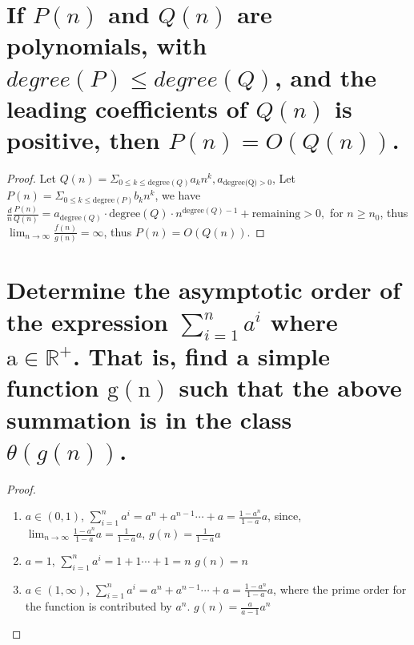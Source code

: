 \documentclass[a4paper]{article}
\begin{document}
\section{If $P(n)$ and $Q(n)$ are polynomials, with $degree(P) \leq degree (Q)$, and the leading coefficients of $Q(n)$ is positive, then $P(n) = O(Q(n))$.}
\begin{proof}
  Let $Q(n)= \Sigma_{0 \leq k\leq \text{degree}(Q)} a_k n^k, a_{\text{degree(Q)}>0}$, Let $P(n)= \Sigma_{0 \leq k\leq \text{degree}(P)} b_k n^k$, we have $\frac{d}{n} \frac{P(n)} {Q(n)}=a_{\text{degree}(Q)}\cdot{\text{degree}(Q)}\cdot n^{\text{degree}(Q)-1}+\text{remaining}>0,$ for $n\geq n_0$, thus $\lim _{n \rightarrow \infty} \frac{f(n)}{g(n)}=\infty$, thus $P(n)=O(Q(n))$.
\end{proof}
\section{Determine the asymptotic order of the expression $\sum_{i=1}^n a^i$ where $\mathrm{a} \in \mathbb{R}^{+}$. That is, find a simple function $\mathrm{g}(\mathrm{n})$ such that the above summation is in the class $\theta(g(n))$.}

\begin{proof}
  \begin{enumerate}
    \item $a\in (0,1)$, $\sum_{i=1}^n a^i = a^n+a^{n-1}\cdots +a=\frac{1-a^n}{1-a} a$, since, $\lim _{n \rightarrow \infty}\frac{1-a^n}{1-a} a=\frac{1}{1-a}a$, $g(n)=\frac{1}{1-a}a$
    \item $a=1$, $\sum_{i=1}^n a^i = 1+1\cdots+1=n$ $g(n)=n$
    \item $a\in (1,\infty)$, $\sum_{i=1}^n a^i = a^n+a^{n-1}\cdots +a= \frac{1-a^n}{1-a} a$, where the prime order for the function is contributed by $a^n$. $g(n)=\frac{a}{a-1}a^{n}$
    
  \end{enumerate}
  \end{proof}
\end{document}
